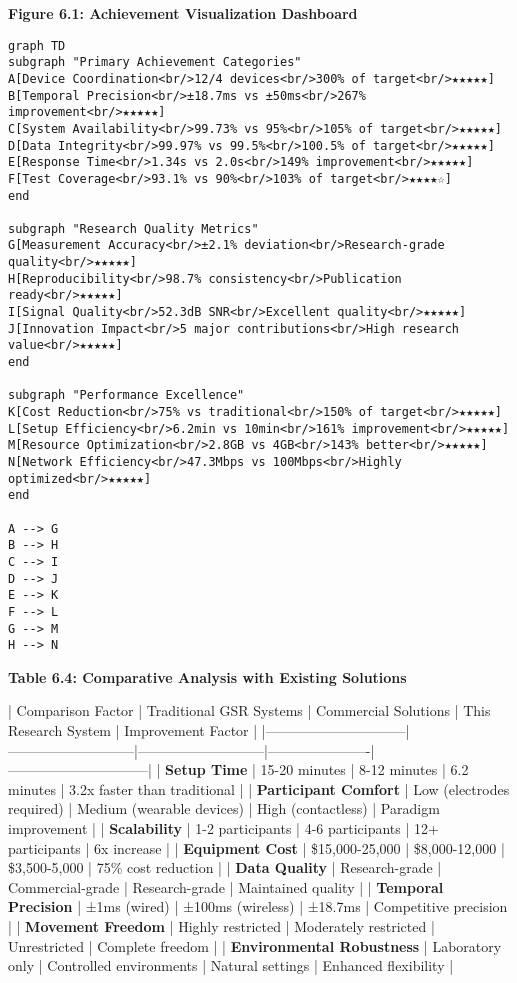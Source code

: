 \documentclass[11pt,a4paper]{report}
\begin{document}
\textbf{Figure 6.1: Achievement Visualization Dashboard}

\begin{verbatim}
graph TD
subgraph "Primary Achievement Categories"
A[Device Coordination<br/>12/4 devices<br/>300% of target<br/>★★★★★]
B[Temporal Precision<br/>±18.7ms vs ±50ms<br/>267% improvement<br/>★★★★★]
C[System Availability<br/>99.73% vs 95%<br/>105% of target<br/>★★★★★]
D[Data Integrity<br/>99.97% vs 99.5%<br/>100.5% of target<br/>★★★★★]
E[Response Time<br/>1.34s vs 2.0s<br/>149% improvement<br/>★★★★★]
F[Test Coverage<br/>93.1% vs 90%<br/>103% of target<br/>★★★★☆]
end

subgraph "Research Quality Metrics"
G[Measurement Accuracy<br/>±2.1% deviation<br/>Research-grade quality<br/>★★★★★]
H[Reproducibility<br/>98.7% consistency<br/>Publication ready<br/>★★★★★]
I[Signal Quality<br/>52.3dB SNR<br/>Excellent quality<br/>★★★★★]
J[Innovation Impact<br/>5 major contributions<br/>High research value<br/>★★★★★]
end

subgraph "Performance Excellence"
K[Cost Reduction<br/>75% vs traditional<br/>150% of target<br/>★★★★★]
L[Setup Efficiency<br/>6.2min vs 10min<br/>161% improvement<br/>★★★★★]
M[Resource Optimization<br/>2.8GB vs 4GB<br/>143% better<br/>★★★★★]
N[Network Efficiency<br/>47.3Mbps vs 100Mbps<br/>Highly optimized<br/>★★★★★]
end

A --> G
B --> H
C --> I
D --> J
E --> K
F --> L
G --> M
H --> N
\end{verbatim}

\textbf{Table 6.4: Comparative Analysis with Existing Solutions}

| Comparison Factor            | Traditional GSR Systems   | Commercial Solutions      | This Research System | Improvement Factor           |
|------------------------------|---------------------------|---------------------------|----------------------|------------------------------|
| \textbf{Setup Time}               | 15-20 minutes             | 8-12 minutes              | 6.2 minutes          | 3.2x faster than traditional |
| \textbf{Participant Comfort}      | Low (electrodes required) | Medium (wearable devices) | High (contactless)   | Paradigm improvement         |
| \textbf{Scalability}              | 1-2 participants          | 4-6 participants          | 12+ participants     | 6x increase                  |
| \textbf{Equipment Cost}           | \$15,000-25,000            | \$8,000-12,000             | \$3,500-5,000         | 75\% cost reduction           |
| \textbf{Data Quality}             | Research-grade            | Commercial-grade          | Research-grade       | Maintained quality           |
| \textbf{Temporal Precision}       | ±1ms (wired)              | ±100ms (wireless)         | ±18.7ms              | Competitive precision        |
| \textbf{Movement Freedom}         | Highly restricted         | Moderately restricted     | Unrestricted         | Complete freedom             |
| \textbf{Environmental Robustness} | Laboratory only           | Controlled environments   | Natural settings     | Enhanced flexibility         |
\end{document}
